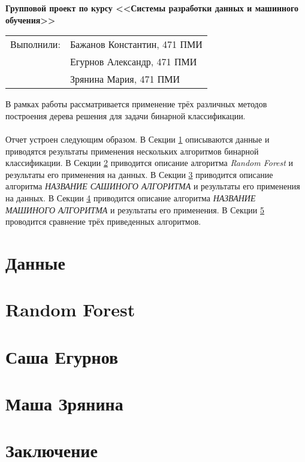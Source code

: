 \documentclass[12pt,a4paper]{article}
\begin{document}
\begin{center}
    \Large \bf Групповой проект по курсу <<Системы разработки данных и машинного обучения>>
\end{center}

\begin{flushleft}
    \begin{tabular}[H]{ll}
        Выполнили: & Бажанов Константин, 471 ПМИ\\
        &Егурнов Александр, 471 ПМИ\\
        &Зрянина Мария, 471 ПМИ\\
    \end{tabular}
\end{flushleft}

В рамках работы рассматривается применение трёх различных методов построения дерева решения для задачи бинарной классификации.\\\\
Отчет устроен следующим образом. В Секции \ref{sec:data} описываются данные и приводятся результаты применения нескольких алгоритмов бинарной классификации.
В Секции \ref{sec:randomforest} приводится описание алгоритма {\it Random Forest} и результаты его применения на данных.
В Секции \ref{sec:sashaegurnov} приводится описание алгоритма {\it НАЗВАНИЕ САШИНОГО АЛГОРИТМА} и результаты его применения на данных.
В Секции \ref{sec:mashazryanina} приводится описание алгоритма {\it НАЗВАНИЕ МАШИНОГО АЛГОРИТМА} и результаты его применения.
В Секции \ref{sec:conclusion} проводится сравнение трёх приведенных алгоритмов.

\section{Данные}
\label{sec:data}

\section{Random Forest}
\label{sec:randomforest}

\section{Саша Егурнов}
\label{sec:sashaegurnov}

\section{Маша Зрянина}
\label{sec:mashazryanina}

\section{Заключение}
\label{sec:conclusion}



\end{document}
